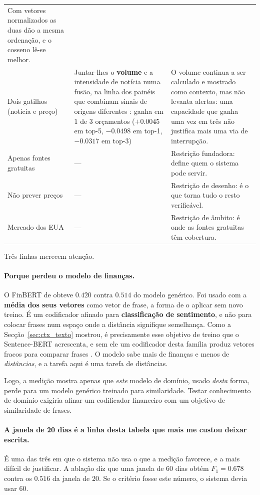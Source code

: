 \begin{table}[ht]
\begin{tabular}{L{0.20\textwidth} L{0.30\textwidth} L{0.38\textwidth}}
Com vetores normalizados as duas dão a mesma ordenação, e o cosseno lê-se melhor. \\
\addlinespace
Dois gatilhos (notícia e preço) & Juntar-lhes o \textbf{volume} e a intensidade de notícia numa
fusão, na linha dos painéis que combinam sinais de origens diferentes \autocite{worldmonitor2026}:
ganha em $1$ de $3$ orçamentos ($+0.0045$ em top-5, $-0.0498$ em top-1, $-0.0317$ em top-3)
& O volume continua a ser calculado e mostrado como contexto, mas não levanta alertas: uma
capacidade que ganha uma vez em três não justifica mais uma via de interrupção. \\
\midrule
Apenas fontes gratuitas & --- & Restrição fundadora: define quem o sistema pode servir. \\
Não prever preços & --- & Restrição de desenho: é o que torna tudo o resto verificável. \\
Mercado dos EUA & --- & Restrição de âmbito: é onde as fontes gratuitas têm cobertura. \\
\bottomrule
\end{tabular}
\end{table}

Três linhas merecem atenção.

\paragraph{Porque perdeu o modelo de finanças.}
O FinBERT de \textcite{araci2019finbert} obteve $0.420$ contra $0.514$ do modelo genérico. Foi usado
com a \textbf{média dos seus vetores} como vetor de frase, a forma de o aplicar sem novo treino. É
um codificador afinado
para \textbf{classificação de sentimento}, e não para colocar frases num espaço onde a distância
signifique semelhança. Como a Secção~\ref{sec:ctx_texto} mostrou, é precisamente esse objetivo de
treino que o Sentence-BERT acrescenta, e sem ele um codificador desta família produz vetores fracos
para comparar frases \autocite{reimers2019sbert}. O modelo sabe mais de finanças e menos de
\emph{distâncias}, e a tarefa aqui é uma tarefa de distâncias.

Logo, a medição mostra apenas que \emph{este} modelo de domínio, usado \emph{desta} forma, perde para
um modelo genérico treinado para similaridade. Testar conhecimento de domínio exigiria afinar um
codificador financeiro com um objetivo de similaridade de frases.

\paragraph{A janela de 20 dias é a linha desta tabela que mais me custou deixar escrita.}
É uma das três em que o sistema não usa o que a medição favorece, e a mais difícil de justificar. A ablação diz que uma janela de 60 dias obtém $F_1 = 0.678$
contra os $0.516$ da janela de 20. Se o critério fosse este número, o sistema devia usar 60.

